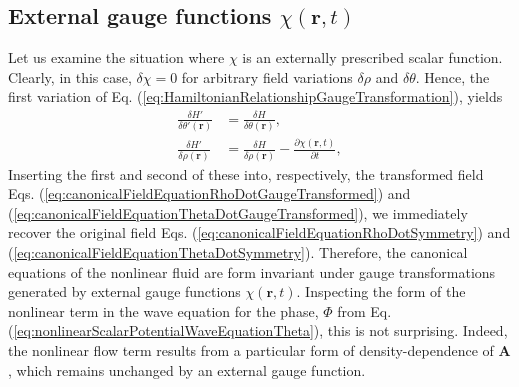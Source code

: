\documentclass[twocolumn, nofootinbib, nobibnotes, amsmath,amssymb,aps, pra, floatfix]{revtex4-1}
\renewcommand{\v}[1]{\ensuremath{\mathbf{#1}}} %
\newcommand{\pd}[2]{\frac{\partial #1}{\partial #2}} %
\begin{document}
\subsection{\label{sec:externalGaugeFunctions}External gauge functions $\chi\left(\v{r}, t\right)$}
Let us examine the situation where $\chi$ is an externally prescribed scalar function.
Clearly, in this case, $\delta\chi=0$ for arbitrary field variations $\delta\rho$ and $\delta\theta$.
Hence, the first variation of Eq. (\ref{eq:HamiltonianRelationshipGaugeTransformation}), yields
\begin{align}
  \frac{\delta H'}{\delta\theta'\left( \v{r} \right)}&= \frac{\delta H}{\delta\theta\left( \v{r} \right)}, \label{eq:variationalDerivativeHamiltonianRelationTheta}\\
  \frac{\delta H'}{\delta\rho\left( \v{r} \right)}&= \frac{\delta H}{\delta\rho\left( \v{r} \right)}-\pd{\chi\left( \v{r},t \right)}{t}, \label{eq:variationalDerivativeHamiltonianRelationRho}
\end{align}
Inserting the first and second of these into, respectively, the transformed field Eqs. (\ref{eq:canonicalFieldEquationRhoDotGaugeTransformed}) and (\ref{eq:canonicalFieldEquationThetaDotGaugeTransformed}), we immediately recover the original field Eqs. (\ref{eq:canonicalFieldEquationRhoDotSymmetry}) and (\ref{eq:canonicalFieldEquationThetaDotSymmetry}).
Therefore, the canonical equations of the nonlinear fluid are form invariant under gauge transformations generated by external gauge functions $\chi\left(\v{r},t\right)$.
Inspecting the form of the nonlinear term in the wave equation for the phase, $\Phi$ from Eq. (\ref{eq:nonlinearScalarPotentialWaveEquationTheta}), this is not surprising.
Indeed, the nonlinear flow term results from a particular form of density-dependence of $\v{A}$, which remains unchanged by an external gauge function.
\end{document}
